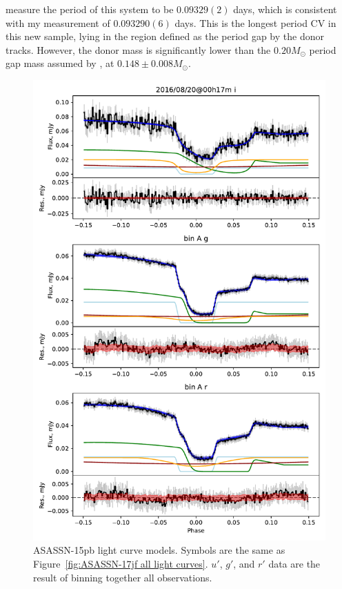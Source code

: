 \citet{paterson2019} measure the period of this system to be $0.09329(2)$ days, which is consistent with my measurement of $0.093290(6)$ days.
This is the longest period CV in this new sample, lying in the region defined as the period gap by the \citet{knigge11} donor tracks. However, the donor mass is significantly lower than the $0.20 M_\odot$ period gap mass assumed by \citet{knigge11}, at $0.148\pm0.008 M_\odot$.

%     

\begin{figure}
    \centering
    \includegraphics[width=\textwidth]{figures/results/ASASSN-15pb/ASASSN-15pb_1.pdf}
    \caption{ASASSN-15pb light curve models. Symbols are the same as Figure~\ref{fig:ASASSN-17jf all light curves}. $u'$, $g'$, and $r'$ data are the result of binning together all observations.}
    \label{fig:ASASSN-15pb all light curves}
\end{figure}

